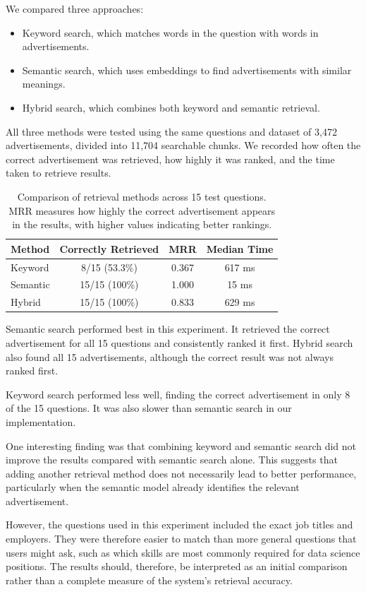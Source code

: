\documentclass[a4paper,10pt]{article}
\begin{document}
We compared three approaches:
\begin{itemize}
    \item Keyword search, which matches words in the question with words in advertisements.
    \item Semantic search, which uses embeddings to find advertisements with similar meanings.
    \item Hybrid search, which combines both keyword and semantic retrieval.
\end{itemize}

All three methods were tested using the same questions and dataset of 3,472 advertisements, divided into 11,704 searchable chunks. We recorded how often the correct advertisement was retrieved, how highly it was ranked, and the time taken to retrieve results.

\begin{table}[htbp]
\centering
\begin{tabular}{lccc}
\toprule
Method & Correctly Retrieved & MRR & Median Time \\
\midrule
Keyword & 8/15 (53.3\%) & 0.367 & 617 ms \\
Semantic & 15/15 (100\%) & 1.000 & 15 ms \\
Hybrid & 15/15 (100\%) & 0.833 & 629 ms \\
\bottomrule
\end{tabular}
\caption{Comparison of retrieval methods across 15 test questions. MRR measures how highly the correct advertisement appears in the results, with higher values indicating better rankings.}
\label{tab:retrieval}
\end{table}

Semantic search performed best in this experiment. It retrieved the correct advertisement for all 15 questions and consistently ranked it first. Hybrid search also found all 15 advertisements, although the correct result was not always ranked first.

Keyword search performed less well, finding the correct advertisement in only 8 of the 15 questions. It was also slower than semantic search in our implementation.

One interesting finding was that combining keyword and semantic search did not improve the results compared with semantic search alone. This suggests that adding another retrieval method does not necessarily lead to better performance, particularly when the semantic model already identifies the relevant advertisement.

However, the questions used in this experiment included the exact job titles and employers. They were therefore easier to match than more general questions that users might ask, such as which skills are most commonly required for data science positions. The results should, therefore, be interpreted as an initial comparison rather than a complete measure of the system's retrieval accuracy.
\end{document}

